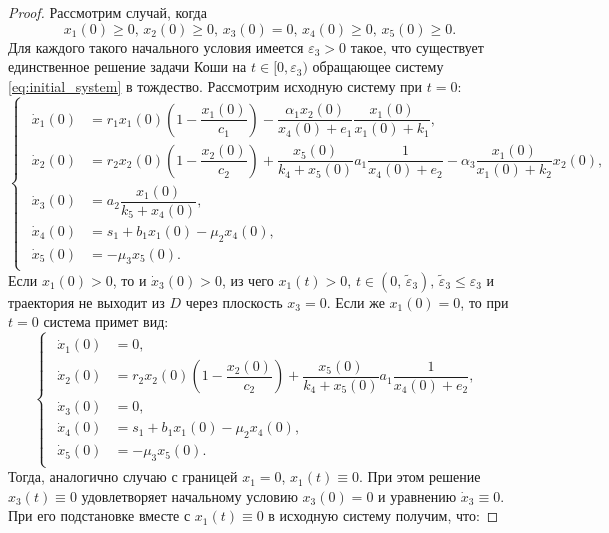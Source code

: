 \documentclass[14pt,a4paper]{extarticle}
\begin{document}
\begin{proof}
		
		Рассмотрим случай, когда
		\begin{equation}\label{eq:conds_3}
			x_1(0)\ge0,\, x_2(0)\ge0,\, x_3(0)=0,\, x_4(0)\ge0,\, x_5(0)\ge0.
		\end{equation}
		Для каждого такого начального условия имеется $\varepsilon_3>0$ такое, что существует единственное решение задачи Коши на $t\in[0,\varepsilon_3)$ обращающее систему \ref{eq:initial_system} в тождество. Рассмотрим исходную систему при $t=0$:
		\begin{equation*}
			\begin{cases}
				\begin{aligned}
					\dot{x}_1(0) &= r_1x_1(0)\left(1-\dfrac{x_1(0)}{c_1}\right)-\dfrac{\alpha_1x_2(0)}{x_4(0)+e_1}\dfrac{x_1(0)}{x_1(0)+k_1},\\
					\dot{x}_2(0) &= r_2x_2(0)\left(1-\dfrac{x_2(0)}{c_2}\right)+\dfrac{x_5(0)}{k_4+x_5(0)}a_1\dfrac{1}{x_4(0)+e_2}-\alpha_3\dfrac{x_1(0)}{x_1(0)+k_2}x_2(0),\\
					\dot{x}_3(0) &= a_2\dfrac{x_1(0)}{k_5+x_4(0)},\\
					\dot{x}_4(0) &= s_1 + b_1x_1(0)-\mu_2x_4(0),\\
					\dot{x}_5(0) &= -\mu_3x_5(0).
				\end{aligned}
			\end{cases}
		\end{equation*}
		Если $x_1(0)>0$, то и $\dot{x}_3(0)>0$, из чего $x_1(t)>0,\, t\in(0,\, \tilde{\varepsilon}_3),\,\tilde{\varepsilon}_3\le\varepsilon_3$ и траектория не выходит из $D$ через плоскость $x_3=0$. Если же $x_1(0)=0$, то при $t=0$ система примет вид:
		\begin{equation*}
			\begin{cases}
				\begin{aligned}
					\dot{x}_1(0) &= 0,\\
					\dot{x}_2(0) &= r_2x_2(0)\left(1-\dfrac{x_2(0)}{c_2}\right)+\dfrac{x_5(0)}{k_4+x_5(0)}a_1\dfrac{1}{x_4(0)+e_2},\\
					\dot{x}_3(0) &= 0,\\
					\dot{x}_4(0) &= s_1 + b_1x_1(0)-\mu_2x_4(0),\\
					\dot{x}_5(0) &= -\mu_3x_5(0).
				\end{aligned}
			\end{cases}
		\end{equation*}
		Тогда, аналогично случаю с границей $x_1=0$, $x_1(t)\equiv0$. При этом решение $x_3(t)\equiv0$ удовлетворяет начальному условию $x_3(0)=0$ и уравнению $\dot{x}_3\equiv0$. При его подстановке вместе с $x_1(t)\equiv0$ в исходную систему получим, что:

\end{proof}
\end{document}
